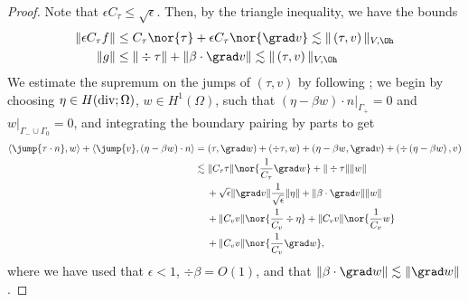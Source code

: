 \begin{proof}
Note that $\epsilon C_\tau \leq \sqrt{\epsilon}$. Then, by the triangle inequality, we have the bounds
\begin{align*}
\|\epsilon C_\tau f \| &\leq C_\tau \nor{ \tau} + \epsilon C_\tau \nor{\grad v} \lesssim \| \left(\tau,v\right)\|_{V,\Oh}\\
\|g \| &\leq \|\div \tau\| +  \|\beta \cdot \grad v\| \lesssim \| \left(\tau,v\right)\|_{V,\Oh}
\end{align*}
We estimate the supremum on the jumps of $\left(\tau,v\right)$ by following \cite{DPGrobustness}; we begin by choosing $\eta \in H({\rm div}; \Omega)$, $w\in H^1(\Omega)$, such that $\left.\left(\eta-\beta w \right)\cdot n\right |_{\Gamma_+} = 0$ and $\left.w\right |_{\Gamma_-\cup\Gamma_0} = 0$, and integrating the boundary pairing by parts to get
\begin{align*}
\langle \jump{\tau\cdot n},w\rangle + \langle \jump{v},\left(\eta - \beta w\right)\cdot n\rangle &= (\tau,\grad w) + (\div \tau, w) + \left(\eta - \beta w, \grad v\right) +  \left(\div \left(\eta - \beta w\right), v\right)\\
&\lesssim \|C_\tau\tau\| \nor{ \frac{1}{C_\tau}\grad w} + \|\div \tau\| \|w\| \\
&\left.\hspace{.3cm}\right. + \sqrt{\epsilon}\| \grad v \|\frac{1}{\sqrt{\epsilon}}\|\eta\| +  \|\beta \cdot \grad v\| \| w\|\\
&\left.\hspace{.3cm}\right. + \|C_vv\|\nor{\frac{1}{C_v}\div \eta} + \| C_vv\| \nor{\frac{1}{C_v}w} \\
&\left.\hspace{.3cm}\right. + \|C_v v\| \nor{\frac{1}{C_v} \grad w},
\end{align*}
where we have used that $\epsilon < 1$, $\div \beta = O(1)$, and that $\|\beta\cdot \grad w\|\lesssim \|\grad w\|$.  


\end{proof}
